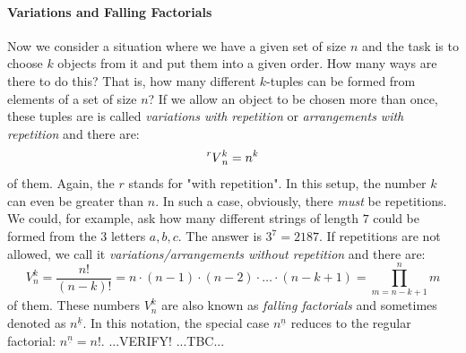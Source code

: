 



\paragraph{Variations and Falling Factorials}
Now we consider a situation where we have a given set of size $n$ and the task is to choose $k$ objects from it and put them into a given order. How many ways are there to do this? That is, how many different $k$-tuples can be formed from elements of a set of size $n$? If we allow an object to be chosen more than once, these tuples are is called \emph{variations with repetition} or \emph{arrangements with repetition} and there are:
\begin{equation}
\prescript{r}{}{V}_n^k = n^k
\end{equation}
of them. Again, the $r$ stands for "with repetition". In this setup, the number $k$ can even be greater than $n$. In such a case, obviously, there \emph{must} be repetitions. We could, for example, ask how many different strings of length $7$ could be formed from the $3$ letters $a,b,c$. The answer is $3^7 = 2187$. If repetitions are not allowed, we call it \emph{variations/arrangements without repetition} and there are:
\begin{equation}
V_n^k = \frac{n!}{(n-k)!} 
      = n \cdot (n-1) \cdot (n-2) \cdot \ldots \cdot (n-k+1) 
      = \prod_{m=n-k+1}^{n} m
\end{equation}
of them. These numbers $V_n^k$ are also known as \emph{falling factorials} and sometimes denoted as $n^{\underline{k}}$. In this notation, the special case  $n^{\underline{n}}$ reduces to the regular factorial: $n^{\underline{n}} = n!$. ...VERIFY! ...TBC...


